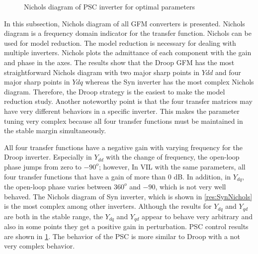 \begin{figure}[ht]
    \centering
     \nonindent
	\caption[Nichols diagram of \gls{PSC} inverter]{Nichols diagram of \gls{PSC} inverter for optimal parameters}
	\label{res:PSCNichols}
\end{figure}
 In this subsection, Nichols diagram of all GFM converters is presented. Nichols diagram is a frequency domain indicator for the transfer function. Nichols can be used for model reduction. The model reduction is necessary for dealing with multiple inverters. Nichols plots the admittance of each component with the gain and phase in the axes. The results show that the Droop GFM has the most straightforward Nichols diagram with two major sharp points in $Ydd$ and four major sharp points in $Ydq$ whereas the \gls{Syn} inverter has the most complex Nichols diagram. Therefore, the Droop strategy is the easiest to make the model reduction study. Another noteworthy point is that the four transfer matrices may have very different behaviors in a specific inverter. This makes the parameter tuning very complex because all four transfer functions must be maintained in the stable margin simultaneously.
 
 All four transfer functions have a negative gain with varying frequency for the Droop inverter. Especially in $Y_{dd}$ with the change of frequency, the open-loop phase jumps from zero to $-90^o$; however, In \gls{VIL} with the same parameters, all four transfer functions that have a gain of more than 0 dB. In addition, in $Y_{dq}$, the open-loop phase varies between $360^o$ and $-90$, which is not very well behaved. The Nichols diagram of \gls{Syn} inverter, which is shown in \ref{res:SynNichols} is the most complex among other inverters. Although the results for $Y_{dq}$ and $Y_{qd}$ are both in the stable range, the $Y_{dq}$ and $Y_{qd}$ appear to behave very arbitrary and also in some points they get a positive gain in perturbation. \gls{PSC} control results are shown in \ref{res:PSCNichols}. The behavior of the \gls{PSC} is more similar to Droop with a not very complex behavior.
 
